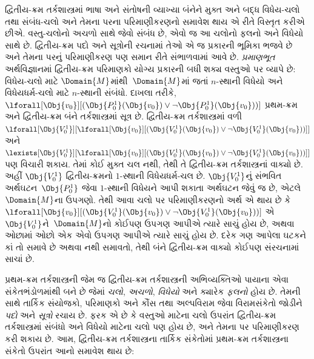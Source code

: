 દ્વિતીય-ક્રમ તર્કશાસ્ત્રમાં ભાષા અને સંતોષની વ્યાખ્યા બંનેને મુક્ત અને
બદ્ધ વિધેય-ચલો તથા સંબંધ-ચલો અને તેમના પરના પરિમાણીકરણનો સમાવેશ થાય
એ રીતે વિસ્તૃત કરીએ છીએ. વસ્તુ-ચલોનો અચળો સાથે જેવો સંબંધ છે,
એવો જ આ ચલોનો ફલનો અને વિધેયો સાથે છે. દ્વિતીય-ક્રમ
પદો અને સૂત્રોની રચનામાં તેઓ એ જ પ્રકારની ભૂમિકા ભજવે છે અને
તેમના પરનું પરિમાણીકરણ પણ સમાન રીતે સંભાળવામાં આવે છે. \emph{પ્રમાણભૂત}
અર્થવિજ્ઞાનમાં દ્વિતીય-ક્રમ પરિમાણકો યોગ્ય પ્રકારની બધી શક્ય વસ્તુઓ
પર વ્યાપે છે: વિધેય-ચલો માટે $\Domain{M}$માંથી~$\Domain{M}$માં જતાં
$n$-સ્થાની વિધેયો અને વિધેયધર્મ-ચલો માટે $n$-સ્થાની સંબંધો.
દાખલા તરીકે,
$\lforall[\Obj{v_0}][(\Obj{P^1_0}(\Obj{v_0}) \lor \lnot
  \Obj{P^1_0}(\Obj{v_0}))]$ પ્રથમ-ક્રમ અને દ્વિતીય-ક્રમ બંને
તર્કશાસ્ત્રમાં સૂત્ર છે. દ્વિતીય-ક્રમ તર્કશાસ્ત્રમાં વળી
$\lforall[\Obj{V^1_0}][\lforall[\Obj{v_0}][(\Obj{V^1_0}(\Obj{v_0}) \lor
    \lnot \Obj{V^1_0}(\Obj{v_0}))]]$ અને
$\lexists[\Obj{V^1_0}][\lforall[\Obj{v_0}][(\Obj{V^1_0}(\Obj{v_0}) \lor
    \lnot \Obj{V^1_0}(\Obj{v_0}))]]$ પણ વિચારી શકાય. તેમાં કોઈ મુક્ત
ચલ નથી, તેથી તે દ્વિતીય-ક્રમ તર્કશાસ્ત્રનાં વાક્યો છે. અહીં
$\Obj{V^1_0}$ દ્વિતીય-ક્રમનો $1$-સ્થાની વિધેયધર્મ-ચલ છે. $\Obj{V^1_0}$નું
સંભવિત અર્થઘટન~$\Obj{P^1_0}$ જેવા $1$-સ્થાની વિધેયને આપી
શકાતા અર્થઘટન જેવું જ છે, એટલે~$\Domain{M}$ના ઉપગણો. તેથી આવા ચલો
પર પરિમાણીકરણનો અર્થ એ થાય છે કે
$\lforall[\Obj{v_0}][(\Obj{V^1_0}(\Obj{v_0}) \lor \lnot
  \Obj{V^1_0}(\Obj{v_0}))]$ એ~$\Obj{V^1_0}$ને~$\Domain{M}$નો કોઈપણ
ઉપગણ આપીએ ત્યારે સાચું હોય છે, અથવા ઓછામાં ઓછો એક એવો ઉપગણ આપીએ
ત્યારે સાચું હોય છે. દરેક ગણ આપેલા ઘટકને કાં તો સમાવે છે અથવા નથી
સમાવતો, તેથી બંને દ્વિતીય-ક્રમ વાક્યો કોઈપણ સંરચનામાં સાચાં છે.
\endgroup


\begingroup
\makeatletter{}\makeatother


\label{guunit:OLP-0325}


પ્રથમ-ક્રમ તર્કશાસ્ત્રની જેમ જ દ્વિતીય-ક્રમ તર્કશાસ્ત્રની અભિવ્યક્તિઓ
પાયાના એવા સંકેતભંડોળમાંથી બને છે જેમાં \emph{ચલો},
\emph{અચળો}, \emph{વિધેયો} અને ક્યારેક
\emph{ફલનો} હોય છે. તેમની સાથે તાર્કિક સંયોજકો, પરિમાણકો
અને કૌંસ તથા અલ્પવિરામ જેવા વિરામસંકેતો જોડીને \emph{પદો} અને
\emph{સૂત્રો} રચાય છે. ફરક એ છે કે વસ્તુઓ માટેના ચલો ઉપરાંત
દ્વિતીય-ક્રમ તર્કશાસ્ત્રમાં સંબંધો અને વિધેયો માટેના ચલો પણ હોય છે,
અને તેમના પર પરિમાણીકરણ કરી શકાય છે. આમ, દ્વિતીય-ક્રમ તર્કશાસ્ત્રના
તાર્કિક સંકેતોમાં પ્રથમ-ક્રમ તર્કશાસ્ત્રના સંકેતો ઉપરાંત આનો સમાવેશ થાય છે:

